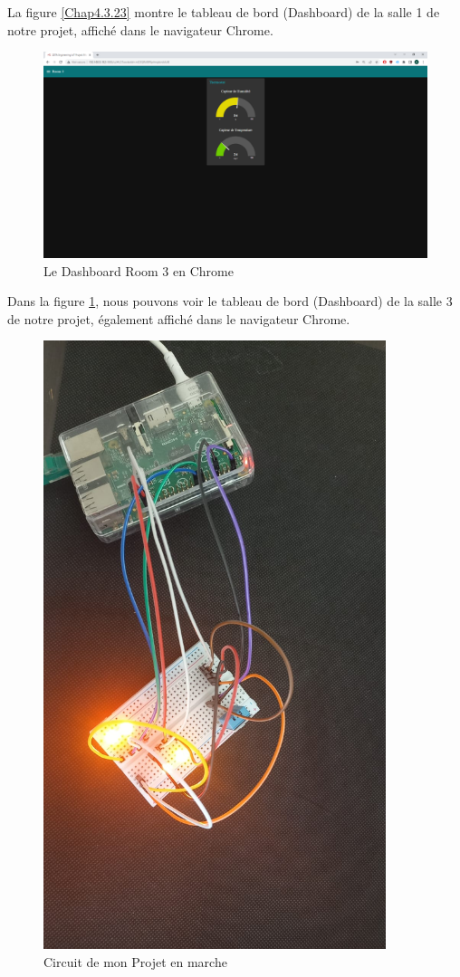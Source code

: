 La figure \ref{Chap4.3.23} montre le tableau de bord (Dashboard) de la salle 1 de notre projet, affiché dans le navigateur Chrome.

\begin{figure}[H]
\centering
\includegraphics[width=13cm]{Images/150156.png}
\caption{Le Dashboard Room 3 en Chrome}
\label{Chap4.3.24}
\end{figure}

Dans la figure \ref{Chap4.3.24}, nous pouvons voir le tableau de bord (Dashboard) de la salle 3 de notre projet, également affiché dans le navigateur Chrome.

\begin{figure}[H]
\centering
\includegraphics[width=10cm]{Images/Node-12.jpg}
\caption{Circuit de mon Projet en marche}
\label{Chap4.3.25}
\end{figure}


